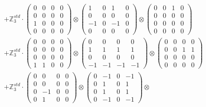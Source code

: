 \documentclass{article}
\begin{document}
{\begin{align}
        &+ \label{Rs16-Rc11-Strassen-1-c22} \mathbb{Z}_3^{std} \cdot 
            \begin{pmatrix} 0 & 0 & 0 & 0 \\ 0 & 0 & 0 & 0 \\ 1 & 0 & 0 & 0 \\ 0 & 0 & 0 & 0 \end{pmatrix} \otimes 
            \begin{pmatrix} 1 & 0 & 1 & 0 \\ 0 & 0 & 0 & 0 \\ -1 & 0 & -1 & 0 \\ 0 & 0 & 0 & 0 \end{pmatrix} \otimes 
            \begin{pmatrix} 0 & 0 & 1 & 0 \\ 0 & 0 & 0 & 0 \\ 0 & 0 & 0 & 0 \\ 0 & 0 & 0 & 0 \end{pmatrix} \\ 
        &+ \label{Rs16-Rc11-Strassen-1-c23} \mathbb{Z}_3^{std} \cdot 
            \begin{pmatrix} 0 & 0 & 0 & 0 \\ 0 & 0 & 0 & 0 \\ 0 & 0 & 0 & 0 \\ 1 & 1 & 0 & 0 \end{pmatrix} \otimes 
            \begin{pmatrix} 0 & 0 & 0 & 0 \\ 1 & 1 & 1 & 1 \\ 0 & 0 & 0 & 0 \\ -1 & -1 & -1 & -1 \end{pmatrix} \otimes 
            \begin{pmatrix} 0 & 0 & 0 & 0 \\ 0 & 0 & 1 & 1 \\ 0 & 0 & 0 & 0 \\ 0 & 0 & 0 & 0 \end{pmatrix} \\ 
        &+ \label{Rs16-Rc11-Strassen-1-c24} \mathbb{Z}_3^{std} \cdot 
            \begin{pmatrix} 0 & 0 & 0 & 0 \\ 0 & 0 & 0 & 0 \\ 0 & -1 & 0 & 0 \\ 0 & 1 & 0 & 0 \end{pmatrix} \otimes 
            \begin{pmatrix} 0 & -1 & 0 & -1 \\ 0 & 1 & 0 & 1 \\ 0 & 1 & 0 & 1 \\ 0 & -1 & 0 & -1 \end{pmatrix} \otimes 

\end{align}}
\end{document}
